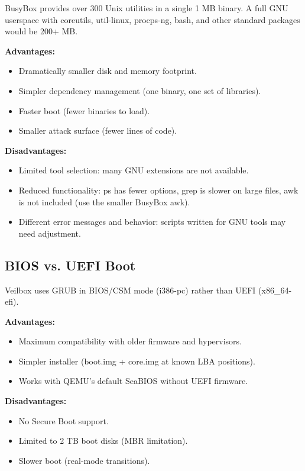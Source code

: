 BusyBox provides over 300 Unix utilities in a single 1 MB binary. A full
GNU userspace with coreutils, util-linux, procps-ng, bash, and other
standard packages would be 200+ MB.

\textbf{Advantages:}
\begin{itemize}[nosep]
  \item Dramatically smaller disk and memory footprint.
  \item Simpler dependency management (one binary, one set of libraries).
  \item Faster boot (fewer binaries to load).
  \item Smaller attack surface (fewer lines of code).
\end{itemize}

\textbf{Disadvantages:}
\begin{itemize}[nosep]
  \item Limited tool selection: many GNU extensions are not available.
  \item Reduced functionality: ps has fewer options, grep is slower on
        large files, awk is not included (use the smaller BusyBox awk).
  \item Different error messages and behavior: scripts written for GNU
        tools may need adjustment.
\end{itemize}

\subsection{BIOS vs. UEFI Boot}

Veilbox uses GRUB in BIOS/CSM mode (i386-pc) rather than UEFI (x86\_64-efi).

\textbf{Advantages:}
\begin{itemize}[nosep]
  \item Maximum compatibility with older firmware and hypervisors.
  \item Simpler installer (boot.img + core.img at known LBA positions).
  \item Works with QEMU's default SeaBIOS without UEFI firmware.
\end{itemize}

\textbf{Disadvantages:}
\begin{itemize}[nosep]
  \item No Secure Boot support.
  \item Limited to 2 TB boot disks (MBR limitation).
  \item Slower boot (real-mode transitions).
\end{itemize}
